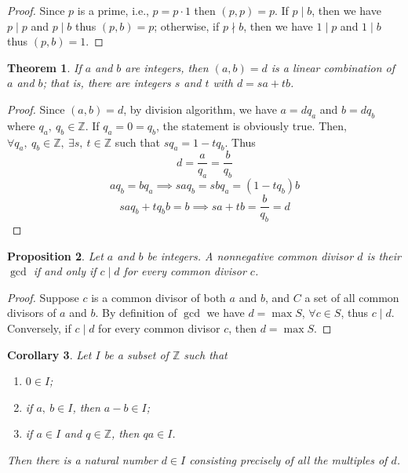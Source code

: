 \documentclass{article}
\newtheorem{theorem}{Theorem}[section]
\newtheorem{proposition}[theorem]{Proposition}
\newtheorem{corollary}[theorem]{Corollary}
\begin{document}
    \begin{proof}
        Since \(p\) is a prime, i.e., \(p=p \cdot 1 \) then \((p, p) = p\). If \(p \mid b\), 
        then we have \(p \mid p\) and \(p \mid b\) thus \((p, b)=p\); otherwise, if \(p \nmid b\), 
        then we have \(1 \mid p\) and \(1 \mid b\) thus \((p, b)=1\).
    \end{proof}
    \begin{theorem}
        If \(a\) and \(b\) are integers, then \((a, b)=d\) is a linear combination of \(a\)
        and \(b\); that is, there are integers \(s\) and \(t\) with \(d=sa+tb\).
    \end{theorem}
    \begin{proof}
        Since \((a,b)=d\), by division algorithm, we have \(a=dq_a\) and \(b=dq_b\) where 
        \(q_a,\ q_b \in \mathbb{Z}\). If \(q_a=0=q_b\), the statement is obviously true. 
        Then, \(\forall q_a,\ q_b \in \mathbb{Z}, \ \exists s,\ t \in \mathbb{Z}\) such 
        that \(sq_a=1-tq_b\). Thus 
        \[d=\dfrac{a}{q_a}=\dfrac{b}{q_b}\]
        \[aq_b=bq_a \implies saq_b=sbq_a=(1-tq_b)b\]
        \[saq_b+tq_bb=b \implies sa+tb=\dfrac{b}{q_b}=d\]
    \end{proof}
    \begin{proposition}
        Let \(a\) and \(b\) be integers. A nonnegative common divisor \(d\) is their 
        \(\gcd\) if and only if \(c \mid d\) for every common divisor \(c\).
    \end{proposition}
    \begin{proof}
        Suppose \(c\) is a common divisor of both \(a\) and \(b\), and \(C\) a set of 
        all common divisors of \(a\) and \(b\). By definition of \(\gcd\) we have 
        \(d=\max S\), \(\forall c \in S\), thus \(c \mid d\). Conversely, if \(c \mid d\)
        for every common divisor \(c\), then \(d=\max S\).
    \end{proof}
    \begin{corollary}
        Let \(I\) be a subset of \(\mathbb{Z}\) such that 
        \begin{enumerate}
            \item \(0 \in I\);
            \item if \(a,\ b \in I\), then \(a-b \in I\);
            \item if \(a \in I\) and \(q \in \mathbb{Z}\), then \(qa \in I\).
        \end{enumerate}
        Then there is a natural number \(d \in I\) consisting precisely of all the 
        multiples of \(d\).
    \end{corollary}
\end{document}
